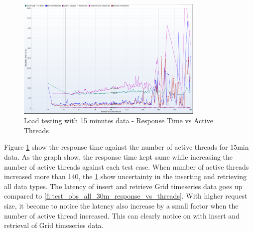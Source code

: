 \begin{figure}[htp]
    \centering
    \includegraphics[width=0.8\textwidth]{results/obs/all/obs_all_15m_response_times_vs_threads.png}
    \caption{Load testing with 15 minutes data - Response Time vs Active Threads}
    \label{fi:test_obs_all_15m_response_vs_threads}
\end{figure}
Figure \ref{fi:test_obs_all_15m_response_vs_threads} show the response time against the number of active threads for 15min data. As the graph show, the response time kept same while increasing the number of active threads against each test case. When number of active threads increased more than 140, the \ref{fi:test_obs_all_15m_response_vs_threads} show uncertainty in the inserting and retrieving all data types. The latency of insert and retrieve Grid timeseries data goes up compared to \ref{fi:test_obs_all_30m_response_vs_threads}.
With higher request size, it become to notice the latency also increase by a small factor when the number of active thread increased. This can clearly notice on with insert and retrieval of Grid timeseries data.


